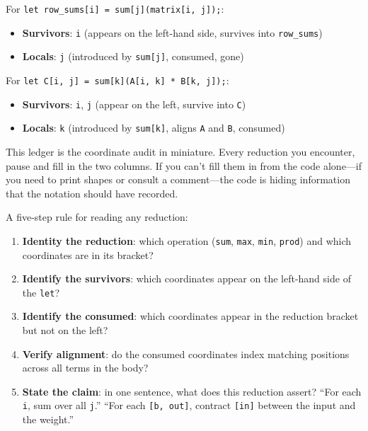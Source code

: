 \documentclass[11pt,]{article}
\providecommand{\tightlist}{%
  \setlength{\itemsep}{0pt}\setlength{\parskip}{0pt}}
\begin{document}
For \texttt{let\ row\_sums{[}i{]}\ =\ sum{[}j{]}(matrix{[}i,\ j{]});}:

\begin{itemize}
\tightlist
\item
  \textbf{Survivors}: \texttt{i} (appears on the left-hand side,
  survives into \texttt{row\_sums})
\item
  \textbf{Locals}: \texttt{j} (introduced by \texttt{sum{[}j{]}},
  consumed, gone)
\end{itemize}

For
\texttt{let\ C{[}i,\ j{]}\ =\ sum{[}k{]}(A{[}i,\ k{]}\ *\ B{[}k,\ j{]});}:

\begin{itemize}
\tightlist
\item
  \textbf{Survivors}: \texttt{i}, \texttt{j} (appear on the left,
  survive into \texttt{C})
\item
  \textbf{Locals}: \texttt{k} (introduced by \texttt{sum{[}k{]}}, aligns
  \texttt{A} and \texttt{B}, consumed)
\end{itemize}

This ledger is the coordinate audit in miniature. Every reduction you
encounter, pause and fill in the two columns. If you can't fill them in
from the code alone---if you need to print shapes or consult a
comment---the code is hiding information that the notation should have
recorded.

A five-step rule for reading any reduction:

\begin{enumerate}
\def\labelenumi{\arabic{enumi}.}
\tightlist
\item
  \textbf{Identity the reduction}: which operation (\texttt{sum},
  \texttt{max}, \texttt{min}, \texttt{prod}) and which coordinates are
  in its bracket?
\item
  \textbf{Identify the survivors}: which coordinates appear on the
  left-hand side of the \texttt{let}?
\item
  \textbf{Identify the consumed}: which coordinates appear in the
  reduction bracket but not on the left?
\item
  \textbf{Verify alignment}: do the consumed coordinates index matching
  positions across all terms in the body?
\item
  \textbf{State the claim}: in one sentence, what does this reduction
  assert? ``For each \texttt{i}, sum over all \texttt{j}.'' ``For each
  \texttt{{[}b,\ out{]}}, contract \texttt{{[}in{]}} between the input
  and the weight.''
\end{enumerate}
\end{document}
